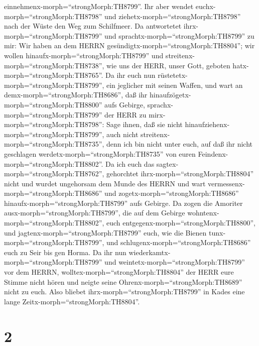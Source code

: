 einnehmenx-morph=``strongMorph:TH8799''.  Ihr aber wendet
euchx-morph=``strongMorph:TH8798'' und
ziehetx-morph=``strongMorph:TH8798'' nach der Wüste den Weg zum
Schilfmeer.  Da antwortetet
ihrx-morph=``strongMorph:TH8799'' und
sprachtx-morph=``strongMorph:TH8799'' zu mir: Wir haben an dem HERRN
gesündigtx-morph=``strongMorph:TH8804''; wir wollen
hinaufx-morph=``strongMorph:TH8799'' und
streitenx-morph=``strongMorph:TH8738'', wie uns der HERR, unser Gott,
geboten hatx-morph=``strongMorph:TH8765''. Da ihr euch nun
rüstetetx-morph=``strongMorph:TH8799'', ein jeglicher mit seinen Waffen,
und wart an demx-morph=``strongMorph:TH8686'', daß ihr
hinaufzögetx-morph=``strongMorph:TH8800'' aufs Gebirge, 
sprachx-morph=``strongMorph:TH8799'' der HERR zu
mirx-morph=``strongMorph:TH8798'': Sage ihnen, daß sie nicht
hinaufziehenx-morph=``strongMorph:TH8799'', auch nicht
streitenx-morph=``strongMorph:TH8735'', denn ich bin nicht unter euch,
auf daß ihr nicht geschlagen werdetx-morph=``strongMorph:TH8735'' von
euren Feindenx-morph=``strongMorph:TH8802''.  Da ich euch
das sagtex-morph=``strongMorph:TH8762'', gehorchtet
ihrx-morph=``strongMorph:TH8804'' nicht und wurdet ungehorsam dem Munde
des HERRN und wart vermessenx-morph=``strongMorph:TH8686'' und
zogetx-morph=``strongMorph:TH8686'' hinaufx-morph=``strongMorph:TH8799''
aufs Gebirge.  Da zogen die Amoriter
ausx-morph=``strongMorph:TH8799'', die auf dem Gebirge
wohntenx-morph=``strongMorph:TH8802'', euch
entgegenx-morph=``strongMorph:TH8800'', und
jagtenx-morph=``strongMorph:TH8799'' euch, wie die Bienen
tunx-morph=``strongMorph:TH8799'', und
schlugenx-morph=``strongMorph:TH8686'' euch zu Seir bis gen Horma.
 Da ihr nun wiederkamtx-morph=``strongMorph:TH8799'' und
weintetx-morph=``strongMorph:TH8799'' vor dem HERRN,
wolltex-morph=``strongMorph:TH8804'' der HERR eure Stimme nicht hören
und neigte seine Ohrenx-morph=``strongMorph:TH8689'' nicht zu euch.
 Also bliebet ihrx-morph=``strongMorph:TH8799'' in Kades
eine lange Zeitx-morph=``strongMorph:TH8804''.

\hypertarget{section-1}{%
\section{2}\label{section-1}}

